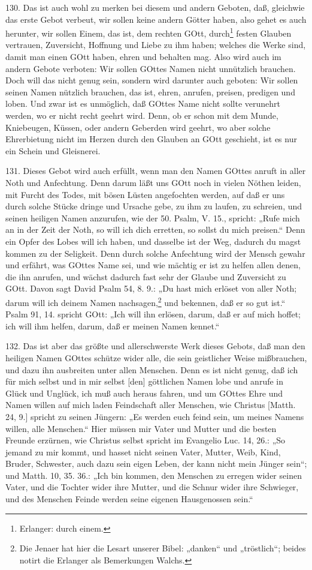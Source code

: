 130. Das ist auch wohl zu merken bei diesem und andern Geboten, daß, gleichwie das erste Gebot verbeut, wir sollen keine andern Götter haben, also gehet es auch herunter, wir sollen Einem, das ist, dem rechten GOtt, durch\footnote{Erlanger: durch einem.} festen Glauben vertrauen, Zuversicht, Hoffnung und Liebe zu ihm haben; welches die Werke sind, damit man einen GOtt haben, ehren und behalten mag. Also wird auch im andern Gebote verboten: Wir sollen GOttes Namen nicht unnützlich brauchen. Doch will das nicht genug
sein, sondern wird darunter auch geboten: Wir sollen seinen Namen nützlich brauchen, das ist, ehren, anrufen, preisen, predigen und loben. Und zwar ist es unmöglich, daß GOttes Name nicht sollte verunehrt werden, wo er nicht recht geehrt wird. Denn, ob er schon mit dem Munde, Kniebeugen, Küssen, oder andern Geberden wird geehrt, wo aber solche Ehrerbietung nicht im Herzen durch den Glauben an GOtt geschieht, ist es nur ein Schein und Gleisnerei.

131. Dieses Gebot wird auch erfüllt, wenn man den Namen GOttes anruft in aller Noth und Anfechtung. Denn darum läßt uns GOtt noch in vielen Nöthen leiden, mit Furcht des Todes, mit bösen Lüsten angefochten werden, auf daß er uns durch solche Stücke dringe und Ursache gebe, zu ihm zu laufen, zu schreien, und seinen heiligen Namen anzurufen, wie der 50. Psalm, V. 15., spricht: „Rufe mich an in der Zeit der Noth, so will ich dich erretten, so sollst du mich preisen.“ Denn ein Opfer des Lobes will ich haben, und dasselbe ist der Weg, dadurch du magst kommen zu der Seligkeit. Denn durch solche Anfechtung wird der Mensch gewahr und erfährt, was GOttes Name sei, und wie mächtig er ist zu helfen allen denen, die ihn anrufen, und wächst dadurch fast sehr der Glaube und Zuversicht zu GOtt. Davon sagt David Psalm 54, 8. 9.: „Du hast mich erlöset von aller Noth; darum will ich deinem Namen nachsagen,\footnote{Die Jenaer hat hier die Lesart unserer Bibel: „danken“ und „tröstlich“; beides notirt die Erlanger als Bemerkungen Walchs.} und bekennen, daß er so gut ist.“ Psalm 91, 14. spricht GOtt: „Ich will ihn erlösen, darum, daß er auf mich hoffet; ich will ihm helfen, darum, daß er meinen Namen kennet.“

132. Das ist aber das größte und allerschwerste Werk dieses Gebots, daß man den heiligen Namen GOttes schütze wider alle, die sein geistlicher Weise mißbrauchen, und dazu ihn ausbreiten unter allen Menschen. Denn es ist nicht genug, daß ich für mich selbst und in mir selbst [den] göttlichen Namen lobe und anrufe in Glück und Unglück, ich muß auch heraus fahren, und um GOttes Ehre und Namen willen auf mich laden Feindschaft aller Menschen, wie Christus [Matth. 24, 9.] spricht zu seinen Jüngern: „Es werden euch feind sein, um meines Namens willen, alle Menschen.“ Hier müssen mir Vater und Mutter und die besten Freunde erzürnen, wie Christus selbst spricht im Evangelio Luc. 14, 26.: „So jemand zu mir kommt, und hasset nicht seinen Vater, Mutter, Weib, Kind, Bruder, Schwester, auch dazu sein eigen Leben, der kann nicht mein Jünger sein“; und Matth. 10, 35. 36.: „Ich bin kommen, den Menschen zu erregen wider seinen Vater, und die Tochter wider ihre Mutter, und die Schnur wider ihre Schwieger, und des Menschen Feinde werden seine eigenen Hausgenossen sein.“

